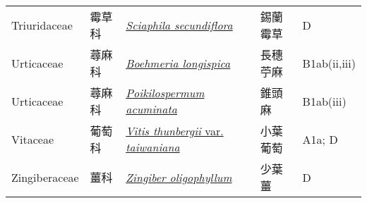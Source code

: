 {\begin{longtable}{L{2.5cm}L{2cm}L{5cm}L{2.5cm}L{3cm}}
    Triuridaceae & 霉草科 & \href{http://www.theplantlist.org/tpl1.1/search?q=Sciaphila+secundiflora}{\textit{Sciaphila secundiflora} } & 錫蘭霉草 & D    \\
    Urticaceae & 蕁麻科 & \href{http://www.theplantlist.org/tpl1.1/search?q=Boehmeria+longispica}{\textit{Boehmeria longispica} } & 長穗苧麻 & B1ab(ii,iii)    \\
    Urticaceae & 蕁麻科 & \href{http://www.theplantlist.org/tpl1.1/search?q=Poikilospermum+acuminata}{\textit{Poikilospermum acuminata} } & 錐頭麻 & B1ab(iii)    \\
    Vitaceae & 葡萄科 & \href{http://www.theplantlist.org/tpl1.1/search?q=Vitis+thunbergii+var.+taiwaniana}{\textit{Vitis thunbergii} var. \textit{taiwaniana} } & 小葉葡萄 & A1a; D    \\
    Zingiberaceae & 薑科 & \href{http://www.theplantlist.org/tpl1.1/search?q=Zingiber+oligophyllum}{\textit{Zingiber oligophyllum} } & 少葉薑 & D    \\
    \bottomrule
        \end{longtable}
        }
    